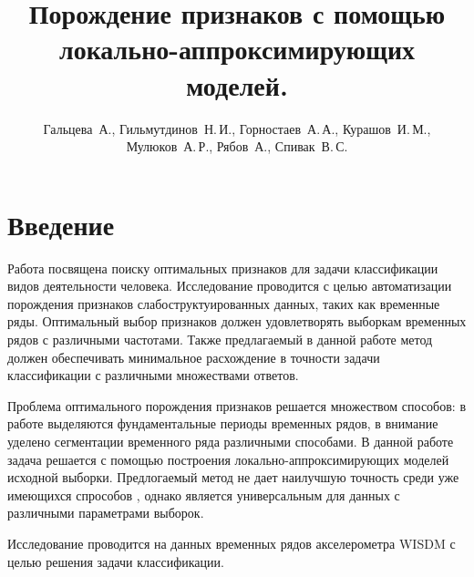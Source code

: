 \documentclass[12pt,twoside]{article}
\title
    [Порождение признаков с помощью локально-аппроксимирующих моделей.]
    {Порождение признаков с помощью локально-аппроксимирующих моделей.}
\author
    [Курашов~И.\,М.]
    {Гальцева~А., Гильмутдинов~Н.\,И., Горностаев~А.\,А., Курашов~И.\,М., Мулюков~А.\,Р., Рябов~А., Спивак~В.\,С.}
\begin{document}
\maketitle

\section{Введение}
Работа посвящена поиску оптимальных признаков для задачи классификации видов деятельности человека. Исследование проводится с целью автоматизации порождения признаков слабоструктуированных данных, таких как временные ряды. Оптимальный выбор признаков должен удовлетворять выборкам временных рядов с различными частотами. Также предлагаемый в данной работе метод должен обеспечивать минимальное расхождение в точности задачи классификации с различными множествами ответов.

Проблема оптимального порождения признаков решается множеством способов: в работе \cite{journals/titb/MotrenkoS16} выделяются фундаментальные периоды временных рядов, в \cite{journals/titb/KarStr16} внимание уделено сегментации временного ряда различными способами. В данной работе задача решается с помощью построения локально-аппроксимирующих моделей исходной выборки. Предлогаемый метод не дает наилучшую точность среди уже имеющихся спрособов , однако является универсальным для данных с различными параметрами выборок.

Исследование проводится на данных временных рядов акселерометра WISDM с целью решения задачи классификации.





\end{document}
